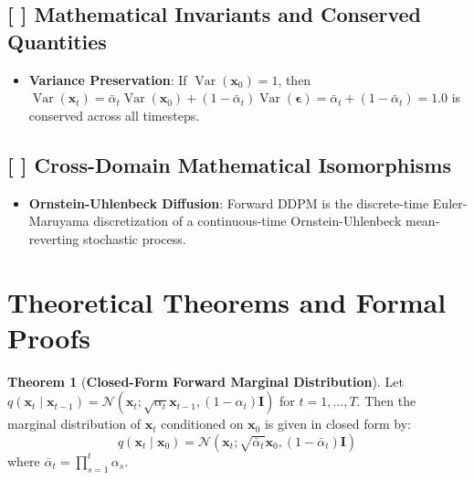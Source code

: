 \documentclass[11pt,a4paper]{article}
\theoremstyle{definition}
\newtheorem{theorem}{\textbf{Theorem}}[section]
\begin{document}
\subsection{[ ] Mathematical Invariants and Conserved Quantities}
\begin{itemize}
    \item \textbf{Variance Preservation}: If $\operatorname{Var}(\mathbf{x}_0) = 1$, then $\operatorname{Var}(\mathbf{x}_t) = \bar{\alpha}_t \operatorname{Var}(\mathbf{x}_0) + (1 - \bar{\alpha}_t)\operatorname{Var}(\boldsymbol{\epsilon}) = \bar{\alpha}_t + (1 - \bar{\alpha}_t) = 1.0$ is conserved across all timesteps.
\end{itemize}

\subsection{[ ] Cross-Domain Mathematical Isomorphisms}
\begin{itemize}
    \item \textbf{Ornstein-Uhlenbeck Diffusion}: Forward DDPM is the discrete-time Euler-Maruyama discretization of a continuous-time Ornstein-Uhlenbeck mean-reverting stochastic process.
\end{itemize}

\section{Theoretical Theorems and Formal Proofs}

\begin{theorem}[\textbf{Closed-Form Forward Marginal Distribution}]
Let $q(\mathbf{x}_t \mid \mathbf{x}_{t-1}) = \mathcal{N}(\mathbf{x}_t; \sqrt{\alpha_t}\mathbf{x}_{t-1}, (1 - \alpha_t)\mathbf{I})$ for $t = 1, \dots, T$. Then the marginal distribution of $\mathbf{x}_t$ conditioned on $\mathbf{x}_0$ is given in closed form by:
{\boldmath
\begin{equation}
q(\mathbf{x}_t \mid \mathbf{x}_0) = \mathcal{N}\left( \mathbf{x}_t; \sqrt{\bar{\alpha}_t}\mathbf{x}_0, (1 - \bar{\alpha}_t)\mathbf{I} \right)
\end{equation}
}
where $\bar{\alpha}_t = \prod_{s=1}^t \alpha_s$.
\end{theorem}
\end{document}
